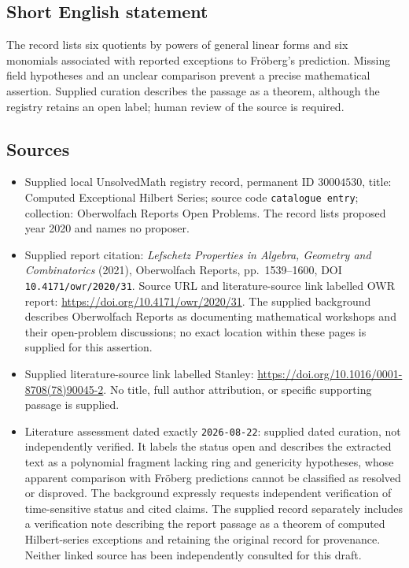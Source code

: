 \documentclass[11pt]{article}
\begin{document}
\subsection{Short English statement}
The record lists six quotients by powers of general linear forms and six monomials associated with reported exceptions to Fr\"oberg's prediction. Missing field hypotheses and an unclear comparison prevent a precise mathematical assertion. Supplied curation describes the passage as a theorem, although the registry retains an open label; human review of the source is required.
\subsection{Sources}
\begin{itemize}
\item Supplied local UnsolvedMath registry record, permanent ID \(30004530\), title: Computed Exceptional Hilbert Series; source code \texttt{catalogue entry}; collection: Oberwolfach Reports Open Problems. The record lists proposed year 2020 and names no proposer.
\item Supplied report citation: \emph{Lefschetz Properties in Algebra, Geometry and Combinatorics} (2021), Oberwolfach Reports, pp.\ 1539--1600, DOI \texttt{10.4171/owr/2020/31}. Source URL and literature-source link labelled OWR report: \url{https://doi.org/10.4171/owr/2020/31}. The supplied background describes Oberwolfach Reports as documenting mathematical workshops and their open-problem discussions; no exact location within these pages is supplied for this assertion.
\item Supplied literature-source link labelled Stanley: \url{https://doi.org/10.1016/0001-8708(78)90045-2}. No title, full author attribution, or specific supporting passage is supplied.
\item Literature assessment dated exactly \texttt{2026-08-22}: supplied dated curation, not independently verified. It labels the status open and describes the extracted text as a polynomial fragment lacking ring and genericity hypotheses, whose apparent comparison with Fr\"oberg predictions cannot be classified as resolved or disproved. The background expressly requests independent verification of time-sensitive status and cited claims. The supplied record separately includes a verification note describing the report passage as a theorem of computed Hilbert-series exceptions and retaining the original record for provenance. Neither linked source has been independently consulted for this draft.
\end{itemize}
\end{document}
